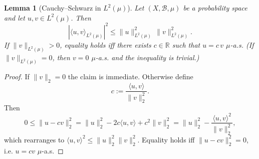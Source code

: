 \documentclass{article}
\theoremstyle{plain}
\newtheorem{lemma}{Lemma}[section]
\numberwithin{equation}{section}
\theoremstyle{definition}
\theoremstyle{remark}
\begin{document}
\begin{lemmaproofbox}
\begin{lemma}[Cauchy--Schwarz in $L^2(\mu)$]
\label{lemma:cs_L2}
Let $(X,\mathcal{B},\mu)$ be a probability space and let $u,v\in L^2(\mu)$. Then
\[
|\langle u,v\rangle_{L^2(\mu)}|^2 \le \|u\|_{L^2(\mu)}^2\,\|v\|_{L^2(\mu)}^2.
\]
If $\|v\|_{L^2(\mu)}>0$, equality holds iff there exists $c\in\mathbb{R}$ such that $u=c\,v$ $\mu$-a.s.
(If $\|v\|_{L^2(\mu)}=0$, then $v=0$ $\mu$-a.s. and the inequality is trivial.)
\end{lemma}

\begin{proof}
If $\|v\|_2=0$ the claim is immediate. Otherwise define
\[
c:=\frac{\langle u,v\rangle}{\|v\|_2^2}.
\]
Then
\[
0\le \|u-cv\|_2^2
= \|u\|_2^2 - 2c\langle u,v\rangle + c^2\|v\|_2^2
= \|u\|_2^2 - \frac{\langle u,v\rangle^2}{\|v\|_2^2},
\]
which rearranges to $\langle u,v\rangle^2\le \|u\|_2^2\|v\|_2^2$. Equality holds iff $\|u-cv\|_2^2=0$, i.e. $u=cv$
$\mu$-a.s.
\end{proof}
\end{lemmaproofbox}
\end{document}
